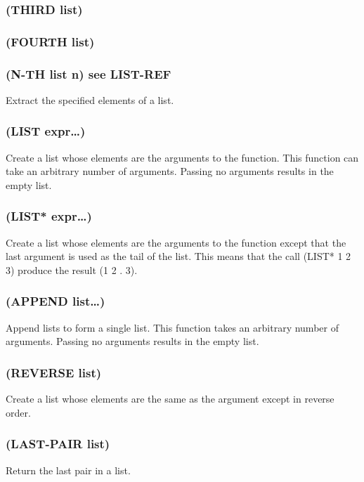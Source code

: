 \documentclass[11pt]{article}
\begin{document}
\subsubsection{(THIRD list)}
\label{sec-4-13-11}
\subsubsection{(FOURTH list)}
\label{sec-4-13-12}
\subsubsection{(N-TH list n) see LIST-REF}
\label{sec-4-13-13}

Extract the specified elements of a list.
\subsubsection{(LIST expr\ldots{})}
\label{sec-4-13-14}

Create a list whose elements are the arguments to the function.  This
function can take an arbitrary number of arguments.  Passing no
arguments results in the empty list.
\subsubsection{(LIST* expr\ldots{})}
\label{sec-4-13-15}

Create a list whose elements are the arguments to the function except
that the last argument is used as the tail of the list.  This means
that the call (LIST* 1 2 3) produce the result (1 2 . 3).
\subsubsection{(APPEND list\ldots{})}
\label{sec-4-13-16}

Append lists to form a single list.  This function takes an arbitrary
number of arguments.  Passing no arguments results in the empty list.
\subsubsection{(REVERSE list)}
\label{sec-4-13-17}

Create a list whose elements are the same as the argument except in
reverse order.
\subsubsection{(LAST-PAIR list)}
\label{sec-4-13-18}

Return the last pair in a list.
\end{document}
